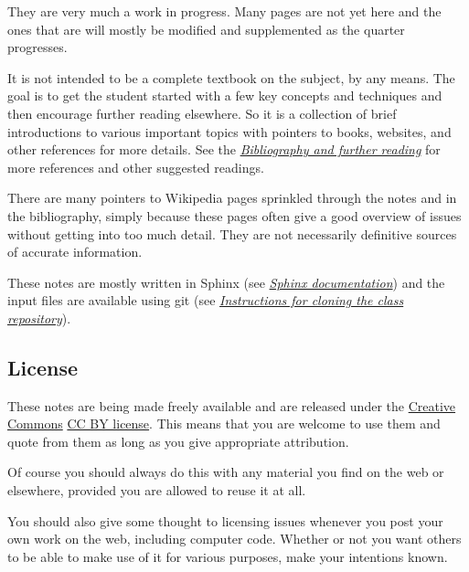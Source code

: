 \documentclass[letterpaper,10pt,english]{sphinxmanual}
\begin{document}
They are very much a work in progress.  Many pages are not yet here and the
ones that are will mostly be modified and supplemented as the quarter
progresses.

It is not intended to be a complete textbook on the subject, by any means.
The goal is to get the student started with a few key concepts and
techniques and then encourage further reading elsewhere.
So it is a collection of brief introductions to various important topics
with pointers to books, websites, and other references for more details.
See the {\hyperref[biblio:biblio]{\emph{Bibliography and further reading}}} for more references and other suggested readings.

There are many pointers to Wikipedia pages sprinkled through the notes and
in the bibliography, simply because these pages often give a good overview
of issues without getting into too much detail.  They are not necessarily
definitive sources of accurate information.

These notes are mostly written in Sphinx (see {\hyperref[sphinx:sphinx]{\emph{Sphinx documentation}}}) and the input
files are available using git (see {\hyperref[git:classgit]{\emph{Instructions for cloning the class repository}}}).


\subsection{License}
\label{about:license}\label{about:id1}
These notes are being made freely available and are released under the
\href{http://creativecommons.org/}{Creative Commons} \href{http://creativecommons.org/licenses/by/3.0/}{CC BY license}.
This means that you are welcome to use them and quote from them
as long as you give appropriate attribution.

Of course you should always do this with any material you find on the web or
elsewhere, provided you are allowed to reuse it at all.

You should also give some thought to licensing issues whenever you post your
own work on the web, including computer code.
Whether or not you want others to be able to make use
of it for various purposes, make your intentions known.
\end{document}
